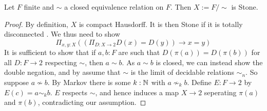 \begin{lemma}
  Let $F$ finite and $\sim $ a closed equivalence relation on $F$. 
  Then $X:=F/\sim$ is Stone. 
\end{lemma}
\begin{proof}
  By definition, $X$ is compact Hausdorff. It is then Stone if it is totally disconnected \parencite[Lemma 4.17]{synthetic-stone-duality}. We thus need to show 
  $$
  \Pi_{x,y:X} ((\Pi_{D:X\to 2} D(x) = D(y)) \to x = y)
  $$
  It is sufficient to show that if $a,b:F$ are such that $D(\pi(a)) = D(\pi(b))$ for all $D:F \to 2$ respecting $\sim$, then $a\sim b$. 
  As $a\sim b$ is closed, we can instead show the double negation, and by  assume that $\sim$ is the limit of decidable relations $\sim_n$. So suppose $a\nsim b$. By Markov there is some $k:\mathbb{N}$ with $a\nsim_k b$. Define $E:F\to 2$ by $E(c) = a\sim_k b$. $E$ respects $\sim$, and hence induces a map $X\to 2$ seperating $\pi(a)$ and $\pi(b)$, contradicting our assumption. 
\end{proof}





